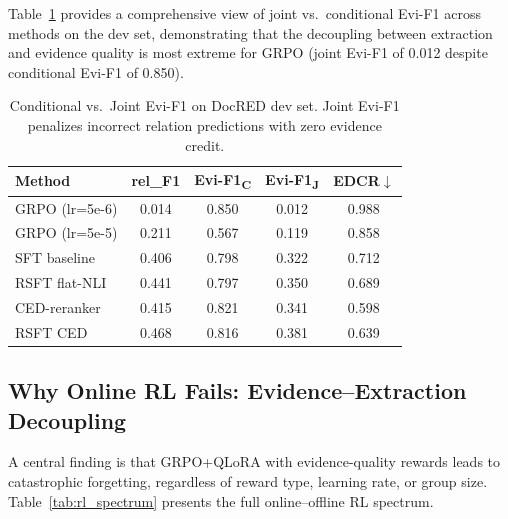 \documentclass[11pt,a4paper]{article}
\newcommand{\edcr}{EDCR}
\newcommand{\rsft}{RSFT}
\begin{document}
Table~\ref{tab:joint_vs_cond} provides a comprehensive view of joint vs.\ conditional Evi-F1 across methods on the dev set, demonstrating that the decoupling between extraction and evidence quality is most extreme for GRPO (joint Evi-F1 of 0.012 despite conditional Evi-F1 of 0.850).

\begin{table}[t]
\centering
\small
\caption{Conditional vs.\ Joint Evi-F1 on DocRED dev set. Joint Evi-F1 penalizes incorrect relation predictions with zero evidence credit.}
\label{tab:joint_vs_cond}
\begin{tabular}{@{}lcccc@{}}
\toprule
\textbf{Method} & \textbf{rel\_F1} & \textbf{Evi-F1\textsubscript{C}} & \textbf{Evi-F1\textsubscript{J}} & \textbf{\edcr{}$\downarrow$} \\
\midrule
GRPO (lr=5e-6)    & 0.014 & 0.850 & 0.012 & 0.988 \\
GRPO (lr=5e-5)    & 0.211 & 0.567 & 0.119 & 0.858 \\
SFT baseline      & 0.406 & 0.798 & 0.322 & 0.712 \\
RSFT flat-NLI     & 0.441 & 0.797 & 0.350 & 0.689 \\
CED-reranker      & 0.415 & 0.821 & 0.341 & 0.598 \\
\rsft{} CED       & 0.468 & 0.816 & 0.381 & 0.639 \\
\bottomrule
\end{tabular}
\end{table}

\subsection{Why Online RL Fails: Evidence--Extraction Decoupling}
\label{sec:grpo_failure}

A central finding is that GRPO+QLoRA with evidence-quality rewards leads to catastrophic forgetting, regardless of reward type, learning rate, or group size.
Table~\ref{tab:rl_spectrum} presents the full online--offline RL spectrum.
\end{document}
